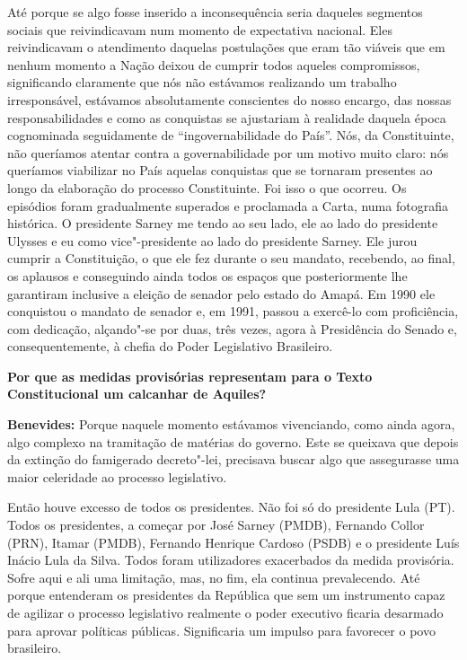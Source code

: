 Até porque se algo fosse inserido a inconsequência seria daqueles
segmentos sociais que reivindicavam num momento de expectativa nacional.
Eles reivindicavam o atendimento daquelas postulações que eram tão
viáveis que em nenhum momento a Nação deixou de cumprir todos aqueles
compromissos, significando claramente que nós não estávamos realizando
um trabalho irresponsável, estávamos absolutamente conscientes do nosso
encargo, das nossas responsabilidades e como as conquistas se ajustariam
à realidade daquela época cognominada seguidamente de
``ingovernabilidade do País''. Nós, da Constituinte, não queríamos
atentar contra a governabilidade por um motivo muito claro: nós
queríamos viabilizar no País aquelas conquistas que se tornaram
presentes ao longo da elaboração do processo Constituinte. Foi isso o
que ocorreu. Os episódios foram gradualmente superados e proclamada a
Carta, numa fotografia histórica. O presidente Sarney me tendo ao seu
lado, ele ao lado do presidente Ulysses e eu como vice"-presidente ao
lado do presidente Sarney. Ele jurou cumprir a Constituição, o que ele
fez durante o seu mandato, recebendo, ao final, os aplausos e
conseguindo ainda todos os espaços que posteriormente lhe garantiram
inclusive a eleição de senador pelo estado do Amapá. Em 1990 ele
conquistou o mandato de senador e, em 1991, passou a exercê-lo com
proficiência, com dedicação, alçando"-se por duas, três vezes, agora à
Presidência do Senado e, consequentemente, à chefia do Poder Legislativo
Brasileiro.

\textbf{Por que as medidas provisórias representam para o Texto
Constitucional um calcanhar de Aquiles?}

\textbf{Benevides:} Porque naquele momento estávamos vivenciando, como
ainda agora, algo complexo na tramitação de matérias do governo. Este se
queixava que depois da extinção do famigerado decreto"-lei, precisava
buscar algo que assegurasse uma maior celeridade ao processo
legislativo.

Então houve excesso de todos os presidentes. Não foi só do presidente
Lula (PT). Todos os presidentes, a começar por José Sarney (PMDB),
Fernando Collor (PRN), Itamar (PMDB), Fernando Henrique Cardoso (PSDB) e
o presidente Luís Inácio Lula da Silva. Todos foram utilizadores
exacerbados da medida provisória. Sofre aqui e ali uma limitação, mas,
no fim, ela continua prevalecendo. Até porque entenderam os presidentes
da República que sem um instrumento capaz de agilizar o processo
legislativo realmente o poder executivo ficaria desarmado para aprovar
políticas públicas. Significaria um impulso para favorecer o povo
brasileiro.


